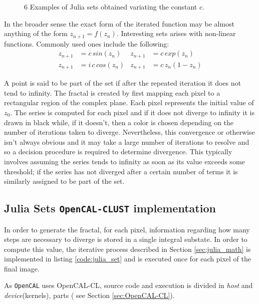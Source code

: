\begin{figure}[!htb]
    \caption{6 Examples of Julia sets obtained variating the constant $c$.}
        \label{fig:julia_set_c}
\end{figure}

In the broader sense the exact form of the iterated function may be almost anything of the form $z_{n+1} = f(z_n)$. Interesting sets arises with non-linear functions. Commonly used ones include the following:
\begin{align*}
z_{n+1} &= c\, sin(z_n) & z_{n+1} &= c \,exp(z_n)\\
z_{n+1} &= i\,c\, cos(z_n) &z_{n+1} &= c\, z_n(1-z_n)
\end{align*}

A point is said to be part of the set if after the repeated iteration it does not tend to infinity.
The fractal is created by first mapping each pixel to a rectangular region of the complex plane. Each pixel represents the initial value of $z_0$. The series is computed for each pixel and if it does not diverge to infinity it is drawn in black while, if it doesn't, then a color is chosen depending on the number of iterations taken to diverge. Nevertheless, this convergence or otherwise isn't always obvious and it may take a large number of iterations to resolve and so a decision procedure is required to determine divergence. This typically involves assuming the series tends to infinity as soon as its value exceeds some threshold; if the series has not diverged after a certain number of terms it is similarly assigned to be part of the set. 

\subsection{Julia Sets \texttt{OpenCAL-CLUST}  implementation}
In order to generate the fractal, for each pixel, information regarding how many steps are necessary to diverge is stored in a single integral substate.
In order to compute this value, the iterative process described in Section \ref{sec:julia_math} is implemented in listing \ref{code:julia_set} and is executed once for each pixel of the final image.

As \texttt{OpenCAL} uses OpenCAL-CL, source code and execution is divided in \textit{host} and \textit{device}(kernels), parts ( see Section \ref{sec:OpenCAL-CL}).  


